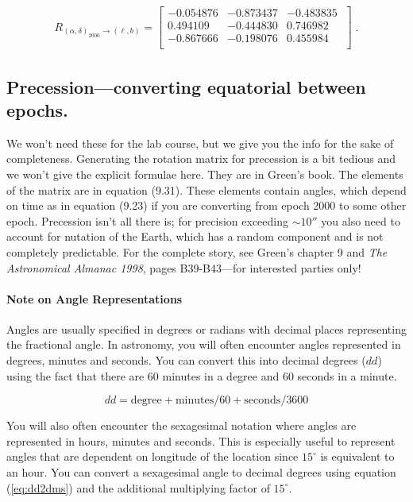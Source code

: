\documentclass[]{article}
\begin{document}
\begin{eqnarray} 
{R}_{(\alpha, \delta)_{2000} \rightarrow (\ell, b)} = \left[ 
\begin{array}{rrr}
   -0.054876 &  -0.873437 &  -0.483835 \\
    0.494109 &  -0.444830 &   0.746982 \\
   -0.867666 &  -0.198076 &   0.455984 \\
\end{array} 
\; \right] \; .
\end{eqnarray} 

\subsection {Precession---converting equatorial between epochs.}

    We won't need these for the lab course, but we give you the info
for the sake of completeness.  Generating the rotation matrix for
precession is a bit tedious and we won't give the explicit formulae
here.  They are in Green's book.  The elements of the matrix are in
equation (9.31).  These elements contain angles, which depend on time as
in equation (9.23) if you are converting from epoch 2000 to some other
epoch.  Precession isn't all there is; for precision exceeding $\sim
10''$ you also need to account for nutation of the Earth, which has a
random component and is not completely predictable.  For the complete
story, see Green's chapter 9 and {\it The Astronomical Almanac 1998}, 
pages B39-B43---for interested parties only!

\paragraph{Note on Angle Representations}
Angles are usually specified in degrees or radians with decimal places 
representing the fractional angle. In astronomy, you will often encounter 
angles represented in degrees, minutes and seconds. You can convert this into 
decimal degrees ($dd$) using the fact that there are 60 minutes in a degree and 60 seconds in a minute.

\begin{equation}\label{eq:dd2dms}
dd = \text{degree} + \text{minutes}/60 + \text{seconds}/3600
\end{equation}

You will also often encounter the sexagesimal notation where angles are represented in hours, minutes and seconds. This is especially useful to represent angles that are dependent on longitude of the location since $15^\circ$ is equivalent to an hour. You can convert a sexagesimal angle to decimal degrees using equation (\ref{eq:dd2dms}) and the additional multiplying factor of $15^\circ$. 
\end{document}
